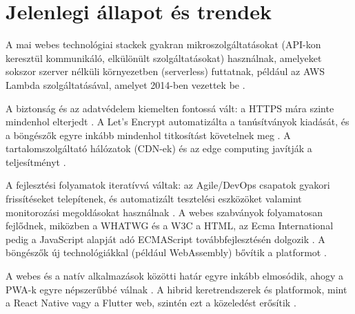 \section{Jelenlegi állapot és trendek}
A mai webes technológiai stackek gyakran mikro­szolgáltatásokat (API-kon keresztül kommunikáló, elkülönült szolgáltatásokat) használnak, amelyeket sokszor szerver nélküli környezetben (serverless) futtatnak, például az AWS Lambda szolgáltatásával, amelyet 2014-ben vezettek be \cite{aws2014lambda}.

A biztonság és az adatvédelem kiemelten fontossá vált: a HTTPS mára szinte mindenhol elterjedt \cite{httpArchive2025security}. A Let's Encrypt automatizálta a tanúsítványok kiadását, és a böngészők egyre inkább mindenhol titkosítást követelnek meg \cite{letsencrypt2015launch,googleChrome2018notSecure}. A tartalomszolgáltató hálózatok (CDN-ek) és az edge computing javítják a teljesítményt \cite{cloudflareCdnEdgeServer}.

A fejlesztési folyamatok iteratívvá váltak: az Agile/DevOps csapatok gyakori frissítéseket telepítenek, és automatizált tesztelési eszközöket valamint monitorozási megoldásokat használnak \cite{agileManifesto2001,dora2018accelerate}. A webes szabványok folyamatosan fejlődnek, miközben a WHATWG és a W3C a HTML, az Ecma International pedig a JavaScript alapját adó ECMAScript továbbfejlesztésén dolgozik \cite{whatwgW3c2019Mou,ecma2024}. A böngészők új technológiákkal (például WebAssembly) bővítik a platformot \cite{w3c2019wasm}.

A webes és a natív alkalmazások közötti határ egyre inkább elmosódik, ahogy a PWA-k egyre népszerűbbé válnak \cite{mdnWhatIsPwa}. A hibrid keretrendszerek és platformok, mint a React Native vagy a Flutter web, szintén ezt a közeledést erősítik \cite{reactNativeDocs,flutterWebsite}.
